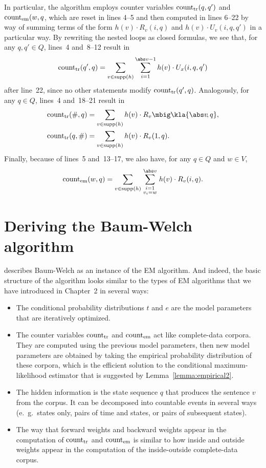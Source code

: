 In particular, the algorithm employs counter variables $\operatorname{count}_\mathrm{tr}(q,q')$
and $\operatorname{count}_\mathrm{em}(w,q$, which are reset in lines 4--5 and then computed in
lines 6--22 by way of summing terms of the form $h(v) \cdot R_v(i,q)$ and
$h(v)\cdot U_v(i,q,q')$ in a particular way. By rewriting the nested loops as
closed formulas, we see that, for any $q,q'\in Q$, lines~4 and~8--12 result in
\begin{equation}\label{eq:03-bw-start}
 \cnt_\mathrm{tr}(q',q) = \sum_{v\in\operatorname{supp}(h)} \sum_{i=1}^{\abs v-1} h(v) \cdot U_x(i,q,q')
\end{equation}
after line~22, since no other statements modify $\operatorname{count}_\mathrm{tr}(q',q)$.
Analogously, for any $q\in Q$, lines~4 and~18--21 result in
\begin{align}
 \cnt_\mathrm{tr}(\#,q) &= \sum_{v\in\operatorname{supp}(h)} h(v) \cdot R_v\mbig\kla{\abs v\!,q}, \\
 \cnt_\mathrm{tr}(q,\#) &= \sum_{v\in\operatorname{supp}(h)} h(v) \cdot R_v(1,q).
\end{align}
Finally, because of lines~5 and~13--17, we also have, for any $q\in Q$ and $w\in V$,
\begin{equation}\label{eq:03-bw-end}
 \cnt_\mathrm{em}(w,q) = \sum_{v\in\operatorname{supp}(h)} \sum_{{\scriptstyle i=1}\atop{\scriptstyle v_i=w}}^{\abs v} h(v) \cdot R_v(i,q).
\end{equation}

\section{Deriving the Baum-Welch algorithm}\label{sect:03-deriving}

\cite{jm09} describes Baum-Welch as an instance of the EM algorithm. And
indeed, the basic structure of the algorithm looks similar to the types of EM
algorithms that we have introduced in Chapter~2 in several ways:
\begin{itemize}
 \item The conditional probability distributions $t$ and $e$ are the model
  parameters that are iteratively optimized.
 \item The counter variables $\operatorname{count}_\mathrm{tr}$ and $\operatorname{count}_\mathrm{em}$ act like
  complete-data corpora. They are computed using the previous model parameters,
  then new model parameters are obtained by taking the empirical probability
  distribution of these corpora, which is the efficient solution to the
  conditional maximum-likelihood estimator that is suggested by
  Lemma~\ref{lemma:empirical2}.
 \item The hidden information is the state sequence $q$ that produces the
  sentence $v$ from the corpus. It can be decomposed into countable events in
  several ways (e.~g.~states only, pairs of time and states, or pairs of
  subsequent states).
 \item The way that forward weights and backward weights appear in the
  computation of $\operatorname{count}_\mathrm{tr}$ and $\operatorname{count}_\mathrm{em}$ is similar to how
  inside and outside weights appear in the computation of the inside-outside
  complete-data corpus.
\end{itemize}

